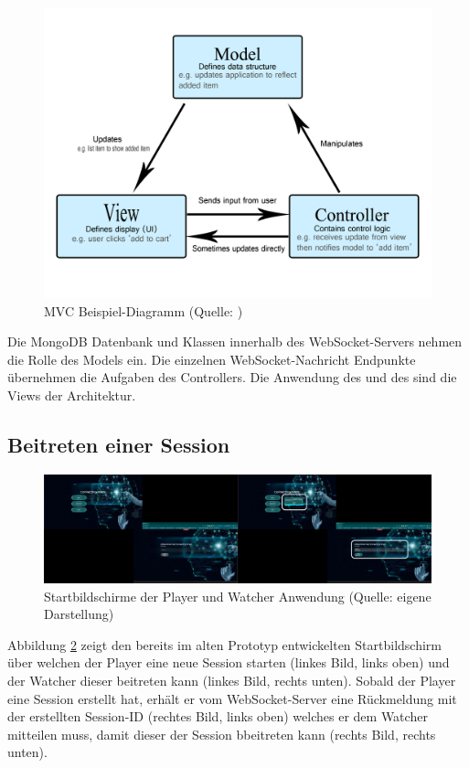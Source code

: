 \begin{figure}[ht]
\centering
\includegraphics[width=1\linewidth]{content/pictures/mvc-architecture.png}
\caption{\ac{MVC} Beispiel-Diagramm (Quelle: \cite{noauthor_mvc_2023})}
\label{fig:mvc-diagramm}
\end{figure}

Die MongoDB Datenbank und Klassen innerhalb des WebSocket-Servers nehmen die Rolle des Models ein. Die einzelnen WebSocket-Nachricht Endpunkte übernehmen die Aufgaben des Controllers. Die Anwendung des  und des  sind die Views der Architektur.

\subsection{Beitreten einer Session}

\begin{figure}[ht]
\centering
\includegraphics[width=1\linewidth]{content/pictures/Login_Login_by_ID.png}
\caption{Startbildschirme der Player und Watcher Anwendung (Quelle: eigene Darstellung)}
\label{fig:old-logins}
\end{figure}

Abbildung \ref{fig:old-logins} zeigt den bereits im alten Prototyp entwickelten Startbildschirm über welchen der Player eine neue Session starten (linkes Bild, links oben) und der Watcher dieser beitreten kann (linkes Bild, rechts unten). Sobald der Player eine Session erstellt hat, erhält er vom WebSocket-Server eine Rückmeldung mit der erstellten Session-ID (rechtes Bild, links oben) welches er dem Watcher mitteilen muss, damit dieser  der Session bbeitreten kann (rechts Bild, rechts unten).

